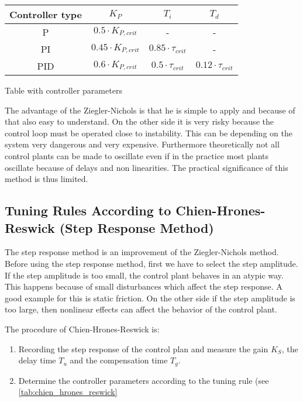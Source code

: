 \begin{center}
    \begin{threeparttable}
        \begin{tabular}{cccc}
            \toprule
            Controller type & $K_{P}$ & $T_{i}$ & $T_{d}$ \\
            \midrule
            P    &  $0.5  \cdot K_{P,crit}$  &  -                         &  -                         \\
            PI   &  $0.45 \cdot K_{P,crit}$  &  $0.85 \cdot \tau_{crit}$  &  -                         \\
            PID  &  $0.6  \cdot K_{P,crit}$  &  $0.5 \cdot \tau_{crit}$   &  $0.12 \cdot \tau_{crit}$  \\
            \bottomrule
        \end{tabular}
        \caption{Table with controller parameters}
        \label{tab:ziegler_nichols}
    \end{threeparttable}
\end{center}

The advantage of the Ziegler-Nichols is that he is simple to apply and because
of that also  easy  to  understand. On the other side it is very risky because
the control loop must be operated close to instability.  This can be depending
on the system very dangerous and very expensive. Furthermore theoretically not
all control plants can be made to oscillate  even  if  in  the  practice  most
plants  oscillate  because  of  delays  and  non  linearities.  The  practical
significance of this method is thus limited.


\subsection{Tuning Rules According to Chien-Hrones-Reswick (Step Response Method)}

The step response method is  an  improvement  of  the  Ziegler-Nichols method.
Before using the step  response  method,  first  we  have  to  select the step
amplitude. If the step amplitude is too small, the control plant behaves in an
atypic way. This happens because of  small  disturbances which affect the step
response. A good example for this is static friction. On the other side if the
step amplitude is too large, then nonlinear effects can affect the behavior of
the control plant.

The procedure of Chien-Hrones-Reswick is:

\begin{enumerate}
    \item Recording the step response of the control plan and measure the gain $K_{S}$, the delay time $T_{u}$ and the compensation time $T_{g}$.
    \item Determine the controller parameters according to the tuning rule (see \ref{tab:chien_hrones_reswick}
\end{enumerate}

